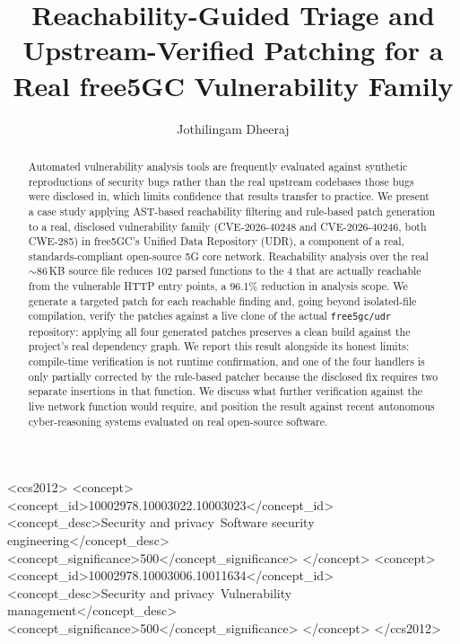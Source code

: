 \documentclass[sigconf]{acmart}
\begin{document}
\title{Reachability-Guided Triage and Upstream-Verified Patching for a Real free5GC Vulnerability Family}

\author{Jothilingam Dheeraj}

\begin{abstract}
Automated vulnerability analysis tools are frequently evaluated against
synthetic reproductions of security bugs rather than the real upstream
codebases those bugs were disclosed in, which limits confidence that results
transfer to practice. We present a case study applying AST-based reachability
filtering and rule-based patch generation to a real, disclosed vulnerability
family (CVE-2026-40248 and CVE-2026-40246, both CWE-285) in free5GC's Unified
Data Repository (UDR), a component of a real, standards-compliant open-source 5G
core network. Reachability analysis over the real $\sim$86\,KB source file
reduces 102 parsed functions to the 4 that are actually reachable from the
vulnerable HTTP entry points, a 96.1\% reduction in analysis scope. We generate
a targeted patch for each reachable finding and, going beyond isolated-file
compilation, verify the patches against a live clone of the actual
\texttt{free5gc/udr} repository: applying all four generated patches preserves a
clean build against the project's real dependency graph. We report this result
alongside its honest limits: compile-time verification is not runtime
confirmation, and one of the four handlers is only partially corrected by the
rule-based patcher because the disclosed fix requires two separate insertions in
that function. We discuss what further verification against the live network
function would require, and position the result against recent autonomous
cyber-reasoning systems evaluated on real open-source software.
\end{abstract}

\begin{CCSXML}
<ccs2012>
<concept>
<concept_id>10002978.10003022.10003023</concept_id>
<concept_desc>Security and privacy~Software security engineering</concept_desc>
<concept_significance>500</concept_significance>
</concept>
<concept>
<concept_id>10002978.10003006.10011634</concept_id>
<concept_desc>Security and privacy~Vulnerability management</concept_desc>
<concept_significance>500</concept_significance>
</concept>
</ccs2012>
\end{CCSXML}

\end{document}
